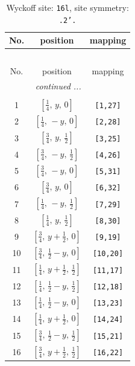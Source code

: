 \documentclass[fleqn,8pt]{jsarticle}
\begin{document}
\renewcommand{\arraystretch}{1.2}
\begin{longtable}{ccc}
\caption{Wyckoff site: {\tt 16l}, site symmetry: {\tt .2'.}}
 \\
 \hline \hline
No. & position & mapping \\ \hline \endfirsthead

\multicolumn{2}{l}{\tablename\ \thetable{}} \\
 \hline \hline
No. & position & mapping \\ \hline \endhead

 \hline \hline
\multicolumn{2}{r}{\footnotesize\it continued ...} \\ \endfoot

 \hline \hline
\multicolumn{2}{r}{} \\ \endlastfoot

1 & $\left[ \frac{1}{4},\, y,\, 0 \right]$ & {\tt [1,27]} \\ \hline
2 & $\left[ \frac{1}{4},\, - y,\, 0 \right]$ & {\tt [2,28]} \\ \hline
3 & $\left[ \frac{3}{4},\, y,\, \frac{1}{2} \right]$ & {\tt [3,25]} \\ \hline
4 & $\left[ \frac{3}{4},\, - y,\, \frac{1}{2} \right]$ & {\tt [4,26]} \\ \hline
5 & $\left[ \frac{3}{4},\, - y,\, 0 \right]$ & {\tt [5,31]} \\ \hline
6 & $\left[ \frac{3}{4},\, y,\, 0 \right]$ & {\tt [6,32]} \\ \hline
7 & $\left[ \frac{1}{4},\, - y,\, \frac{1}{2} \right]$ & {\tt [7,29]} \\ \hline
8 & $\left[ \frac{1}{4},\, y,\, \frac{1}{2} \right]$ & {\tt [8,30]} \\ \hline
9 & $\left[ \frac{3}{4},\, y + \frac{1}{2},\, 0 \right]$ & {\tt [9,19]} \\ \hline
10 & $\left[ \frac{3}{4},\, \frac{1}{2} - y,\, 0 \right]$ & {\tt [10,20]} \\ \hline
11 & $\left[ \frac{1}{4},\, y + \frac{1}{2},\, \frac{1}{2} \right]$ & {\tt [11,17]} \\ \hline
12 & $\left[ \frac{1}{4},\, \frac{1}{2} - y,\, \frac{1}{2} \right]$ & {\tt [12,18]} \\ \hline
13 & $\left[ \frac{1}{4},\, \frac{1}{2} - y,\, 0 \right]$ & {\tt [13,23]} \\ \hline
14 & $\left[ \frac{1}{4},\, y + \frac{1}{2},\, 0 \right]$ & {\tt [14,24]} \\ \hline
15 & $\left[ \frac{3}{4},\, \frac{1}{2} - y,\, \frac{1}{2} \right]$ & {\tt [15,21]} \\ \hline
16 & $\left[ \frac{3}{4},\, y + \frac{1}{2},\, \frac{1}{2} \right]$ & {\tt [16,22]} \\
\end{longtable}
\end{document}

